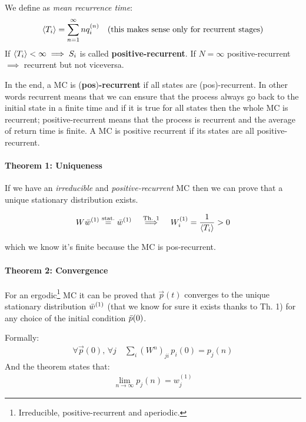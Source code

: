 \documentclass[\main/main.tex]{subfiles}
\begin{document}
\begin{enumerate}
    We define as \textit{mean recurrence time}:
    \begin{eqnarray}
\left\langle T_i \right\rangle=\sum_{n=1}^{\infty}nq_i^{(n)} \quad
\text{(this makes sense only for recurrent stages)}
\end{eqnarray}
    If $\left\langle T_i \right\rangle < \infty \implies S_i$ is called \textbf{positive-recurrent}. If $N=\infty$ positive-recurrent $\implies$ recurrent but not viceversa.
    
    In the end, a MC is (\textbf{pos})\textbf{-recurrent} if all states are (pos)-recurrent.
    In other words recurrent means that we can ensure that the process always go back to the initial state in a finite time and if it is true for all states then the whole MC is recurrent; positive-recurrent means that the process is recurrent and the average of return time is finite. A MC is positive recurrent if its states are all positive-recurrent. 
\end{enumerate}

\paragraph{Theorem 1: Uniqueness} 
If we have an \textit{irreducible} and \textit{positive-recurrent} MC then we can prove that a unique stationary distribution exists.

\begin{eqnarray}
        W\Bar{w}^{(1)}\overset{\text{stat.}}{=}\Bar{w}^{(1)} \quad \overset{\text{Th. 1}}{\implies} \quad W_i^{(1)}=\frac{1}{\left\langle T_i \right\rangle}>0
\end{eqnarray}

which we know it's finite because the MC is pos-recurrent.

\paragraph{{Theorem 2: Convergence}} For an ergodic\footnote{Irreducible, positive-recurrent and aperiodic.} MC it can be proved that
        $\Vec{p}(t)$ {converges to the unique stationary distribution $\Bar{w}^{(1)}$ (that we know for sure it exists thanks to Th. 1)} {for any choice of the initial condition} $\Bar{p}(0)$. 
        
        Formally:
\begin{eqnarray}
        \forall \vec{p}(0),\, \forall j \quad \sum_i(W^n)_{ji}\, {p}_i(0)=p_j(n) 
\end{eqnarray}
And the theorem states that:
\begin{eqnarray}
        \boxed{\lim_{n\to\infty} p_j(n)=w_j^{(1)}}
\end{eqnarray}
\end{document}

